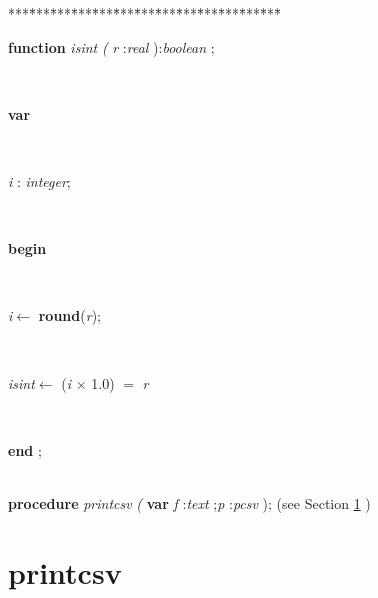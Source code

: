 \begin{tabbing}
***\=***\=***\=***\=***\=***\=***\=***\=***\=***\=***\=***\=***\=\kill
\parbox{14cm}{\textsf{\textbf{function}  \textit{isint} \textit{(} \textit{r} :\textit{real} ):\textit{boolean} ;}}\\
\+\parbox{14cm}{\textsf{\textbf{var} }}\\
\parbox{14cm}{\textsf{\textit{i} : \textit{integer}}; }\\
\-\<\+\parbox{14cm}{\textsf{\textbf{begin} }}\\
\parbox{14cm}{\textsf{\textit{i}$\leftarrow$ \textbf{round}(\textit{r})}; }\\
\parbox{14cm}{\textsf{\textit{isint}$\leftarrow$ (\textit{i} $\times$ 1.0) $=$ \textit{r}}}\\
\<\-\parbox{14cm}{\textsf{\textbf{end} ;}}\\
\+\textsf{\textbf{procedure}  \textit{printcsv} \textit{(} \textbf{var}  \textit{f} :\textit{text} ;\textit{p} :\textit{pcsv} );} (see Section \ref{sec:csvfilereader/getdatamatrix/recursedown/recurse/getcolheaders/recurse/getrowheaders/recurse/colcount/getcell/removetrailingnull/onlynulls/rowcount/isintprintcsv} )\\
\end{tabbing}
\section{printcsv}\label{sec:csvfilereader/getdatamatrix/recursedown/recurse/getcolheaders/recurse/getrowheaders/recurse/colcount/getcell/removetrailingnull/onlynulls/rowcount/isintprintcsv}

